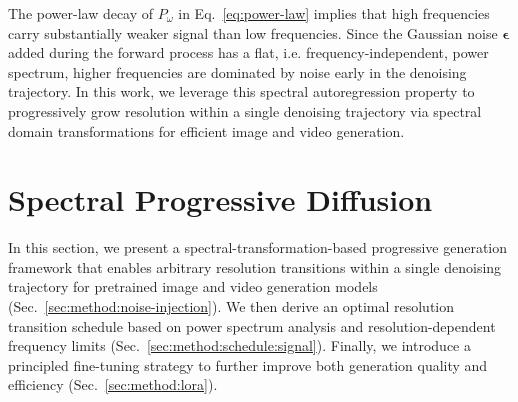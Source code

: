 The power-law decay of $P_\omega$ in Eq.~\eqref{eq:power-law} implies that high frequencies carry substantially weaker signal than low frequencies. Since the Gaussian noise $\boldsymbol{\epsilon}$ added during the forward process has a flat, i.e. frequency-independent, power spectrum, higher frequencies are dominated by noise early in the denoising trajectory. In this work, we leverage this spectral autoregression property to progressively grow resolution within a single denoising trajectory via spectral domain transformations for efficient image and video generation.



\section{Spectral Progressive Diffusion}
In this section, we present a spectral-transformation-based progressive generation framework that enables arbitrary resolution transitions within a single denoising trajectory for pretrained image and video generation models (Sec.~\ref{sec:method:noise-injection}). We then derive an optimal resolution transition schedule based on power spectrum analysis and resolution-dependent frequency limits (Sec.~\ref{sec:method:schedule:signal}). Finally, we introduce a principled fine-tuning strategy to further improve both generation quality and efficiency (Sec.~\ref{sec:method:lora}).

\label{sec:method:schedule}



